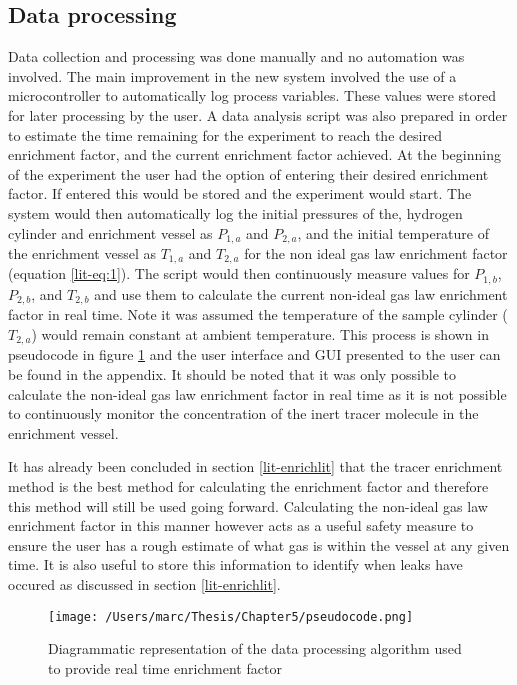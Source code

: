 \subsection{Data processing}\label{dataproc}
Data collection and processing was done manually and no automation was involved. The main improvement in the new system involved the use of a microcontroller to automatically log process variables. These values were stored for later processing by the user. A data analysis script was also prepared in order to estimate the time remaining for the experiment to reach the desired enrichment factor, and the current enrichment factor achieved. At the beginning of the experiment the user had the option of entering their desired enrichment factor. If entered this would be stored and the experiment would start. The system would then automatically log the initial pressures of the, hydrogen cylinder and enrichment vessel as $P_{1,a}$ and $P_{2,a}$, and the initial temperature of the enrichment vessel as $T_{1,a}$ and $T_{2,a}$ for the non ideal gas law enrichment factor (equation \ref{lit-eq:1}). The script would then continuously measure values for $P_{1,b}$, $P_{2,b}$, and $T_{2, b}$ and use them to calculate the current non-ideal gas law enrichment factor in real time. Note it was assumed the temperature of the sample cylinder ($T_{2,a}$) would remain constant at ambient temperature. This process is shown in pseudocode in figure \ref{pseudocode} and the user interface and GUI presented to the user can be found in the appendix. It should be noted that it was only possible to calculate the non-ideal gas law enrichment factor in real time as it is not possible to continuously monitor the concentration of the inert tracer molecule in the enrichment vessel. 

It has already been concluded in section \ref{lit-enrichlit} that the tracer enrichment method is the best method for calculating the enrichment factor and therefore this method will still be used going forward. Calculating the non-ideal gas law enrichment factor in this manner however acts as a useful safety measure to ensure the user has a rough estimate of what gas is within the vessel at any given time. It is also useful to store this information to identify when leaks have occured as discussed in section \ref{lit-enrichlit}.

\begin{figure}
    \centering
    \texttt{[image: /Users/marc/Thesis/Chapter5/pseudocode.png]}
    \caption{Diagrammatic representation of the data processing algorithm used to provide real time enrichment factor}
    \label{pseudocode}
\end{figure}

